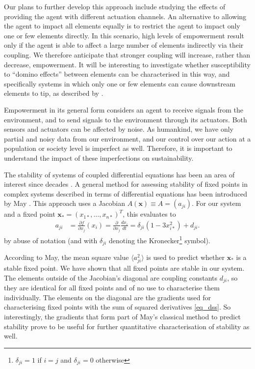 \documentclass[conference]{IEEEtran}
\newcommand{\vectorsym}[1]{\ensuremath{\mathbf{#1}}}
\newcommand{\couplingconstant}{\ensuremath{d}}
\begin{document}
Our plans to further develop this approach include studying the
effects of providing the agent with different actuation channels. An
alternative to allowing the agent to impact all elements equally is to
restrict the agent to impact only one or few elements directly. In
this scenario, high levels of empowerment result only if the agent is
able to affect a large number of elements indirectly via their
coupling. We therefore anticipate that stronger coupling will
increase, rather than decrease, empowerment. It will be interesting to
investigate whether susceptibility to ``domino effects'' between
elements can be characterised in this way, and specifically systems in
which only one or few elements can cause  downstream elements to tip, as
described by \cite{Brummitt2015_coupledcatastrophes}.

Empowerment in its general form considers an agent to receive signals
from the environment, and to send signals to the environment through
its actuators. Both sensors and actuators can be affected by noise. As
humankind, we have only partial and noisy data from our environment,
and our control over our action at a population or society level is
imperfect as well. Therefore, it is important to understand the impact
of these imperfections on sustainability.


The stability of systems of coupled differential equations has been an
area of interest since decades \cite{Landi2018_ecologicalnetworks}. A
general method for assessing stability of fixed points in complex
systems described in terms of differential equations has been
introduced by May \cite{May1972_stablelargecomplexsystem}. This
approach uses a Jacobian $A(\vectorsym{x}) \equiv A = (a_{ji})$. For
our system and a fixed point
$\vectorsym{x}_* = (x_{1*}, \ldots, x_{n*})^T$, this evaluates to
\begin{align*}
  a_{ji} &= \frac{\partial f}{\partial x_j}(x_i) = \frac{\partial}{\partial x_j}\frac{d x_i}{d t} = \delta_{ji} (1 - 3 x_{i*}^2) + d_{ji}.
\end{align*}
by abuse of notation (and with $\delta_{ji}$ denoting the
Kronecker\footnote{$\delta_{ji}=1$ if $i=j$ and $\delta_{ji}=0$
  otherwise} symbol).

According to May, the mean square value $\langle a_{ji}^2 \rangle$ is
used to predict whether $\vectorsym{x}_*$ is a stable fixed point. We
have shown that all fixed points are stable in our system. The
elements outside of the Jacobian's diagonal are coupling constants
$\couplingconstant_{ji}$, so they are identical for all fixed points
and of no use to characterise them individually. The elements on the
diagonal are the gradients used for characterising fixed points with
the sum of squared derivatives \eqref{eq_dss}. So interestingly, the
gradients that form part of May's classical method to predict
stability prove to be useful for further quantitative characterisation
of stability as well.
\end{document}
